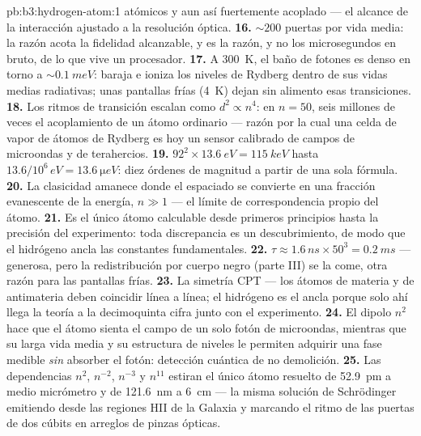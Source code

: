 \begin{solution}{pb:b3:hydrogen-atom:1}
atómicos y aun así fuertemente acoplado --- el alcance de la interacción
ajustado a la resolución óptica.
\textbf{16.} $\sim 200$ puertas por vida media: la razón acota la fidelidad
alcanzable, y es la razón, y no los microsegundos en bruto, de lo que vive
un procesador.
\textbf{17.} A \qty{300}{K}, el baño de fotones es denso en torno a
$\sim\qty{0.1}{meV}$: baraja e ioniza los niveles de Rydberg dentro de
sus vidas medias radiativas; unas pantallas frías (\qty{4}{K}) dejan sin
alimento esas transiciones.
\textbf{18.} Los ritmos de transición escalan como $d^2 \propto n^4$: en $n =
50$, seis millones de veces el acoplamiento de un átomo ordinario ---
razón por la cual una celda de vapor de átomos de Rydberg es hoy un sensor
calibrado de campos de microondas y de terahercios.
\textbf{19.} $92^2 \times \qty{13.6}{eV} = \qty{115}{keV}$ hasta
$13.6/10^6\,\unit{eV} = \qty{13.6}{\micro eV}$: diez órdenes de
magnitud a partir de una sola fórmula.
\textbf{20.} La clasicidad amanece donde el espaciado se convierte en una
fracción evanescente de la energía, $n \gg 1$ --- el límite de
correspondencia propio del átomo.
\textbf{21.} Es el único átomo calculable desde primeros principios
hasta la precisión del experimento: toda discrepancia es un descubrimiento,
de modo que el hidrógeno ancla las constantes fundamentales.
\textbf{22.} $\tau \approx 1.6\,\unit{ns} \times 50^3 =
\qty{0.2}{ms}$ --- generosa, pero la redistribución por cuerpo negro (parte
III) se la come, otra razón para las pantallas frías.
\textbf{23.} La simetría CPT --- los átomos de materia y de antimateria
deben coincidir línea a línea; el hidrógeno es el ancla porque solo ahí
llega la teoría a la decimoquinta cifra junto con el experimento.
\textbf{24.} El dipolo $n^2$ hace que el átomo sienta el campo de un solo
fotón de microondas, mientras que su larga vida media y su estructura de
niveles le permiten adquirir una fase medible \emph{sin} absorber el fotón:
detección cuántica de no demolición.
\textbf{25.} Las dependencias $n^2$, $n^{-2}$, $n^{-3}$ y $n^{11}$ estiran
el único átomo resuelto de \qty{52.9}{pm} a medio micrómetro y
de \qty{121.6}{nm} a \qty{6}{cm} --- la misma solución de Schrödinger
emitiendo desde las regiones HII de la Galaxia y marcando el ritmo de las
puertas de dos cúbits en arreglos de pinzas ópticas.
\end{solution}
